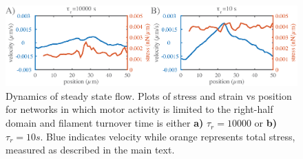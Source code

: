 \begin{figure}[H]
	\centering
	\includegraphics[width=\hsize]{active/figures/FigS6}
	\caption{\label{fig:combo_prof}  Dynamics of steady state flow. Plots of stress and strain vs position for networks in which motor activity is limited to the right-half domain and filament turnover time is either  \textbf{a)} $\tau_r = 10000$ or  \textbf{b)} $\tau_r = 10 s$.  Blue indicates velocity while orange represents total stress, measured as described in the main text. }
\end{figure}
